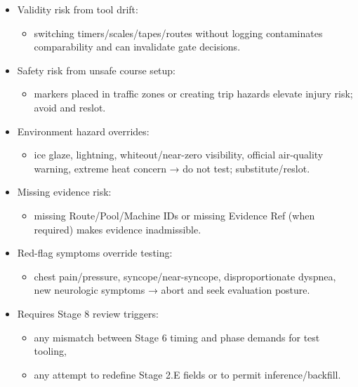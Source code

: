 \documentclass[10pt]{article}
\begin{document}
\begin{itemize}
\item Validity risk from tool drift:
  \begin{itemize}
  \item switching timers/scales/tapes/routes without logging contaminates comparability and can invalidate gate decisions.
  \end{itemize}
\item Safety risk from unsafe course setup:
  \begin{itemize}
  \item markers placed in traffic zones or creating trip hazards elevate injury risk; avoid and reslot.
  \end{itemize}
\item Environment hazard overrides:
  \begin{itemize}
  \item ice glaze, lightning, whiteout/near-zero visibility, official air-quality warning, extreme heat concern → do not test; substitute/reslot.
  \end{itemize}
\item Missing evidence risk:
  \begin{itemize}
  \item missing Route/Pool/Machine IDs or missing Evidence Ref (when required) makes evidence inadmissible.
  \end{itemize}
\item Red-flag symptoms override testing:
  \begin{itemize}
  \item chest pain/pressure, syncope/near-syncope, disproportionate dyspnea, new neurologic symptoms → abort and seek evaluation posture.
  \end{itemize}
\item Requires Stage 8 review triggers:
  \begin{itemize}
  \item any mismatch between Stage 6 timing and phase demands for test tooling,
  \item any attempt to redefine Stage 2.E fields or to permit inference/backfill.
  \end{itemize}
\end{itemize}
\end{document}
